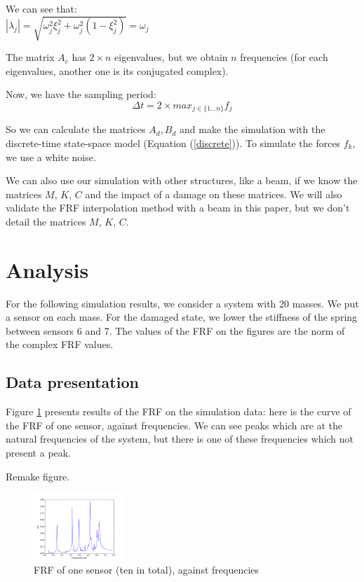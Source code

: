 \documentclass[journal]{IEEEtran}
\begin{document}
\begin{remark}
We can see that:\\
$|\lambda_j| = \sqrt{\omega_j^2 \xi_j^2 + \omega_j^2 (1 - \xi_j^2)} = \omega_j$
\end{remark}

\begin{remark}
The matrix $A_c$ has $2 \times n$ eigenvalues, but we obtain $n$ frequencies (for each eigenvalues, another one is its conjugated complex).
\end{remark}

Now, we have the sampling period:
\begin{equation}
\Delta t = 2 \times max_{j \in \{1 ... n\} } f_j
\end{equation}

So we can calculate the matrices $A_d, B_d$ and make the simulation with the discrete-time state-space model (Equation (\ref{discrete})). To simulate the forces $f_k$, we use a white noise.


We can also use our simulation with other structures, like a beam, if we know the matrices $M$, $K$, $C$ and the impact of a damage on these matrices.
We will also validate the FRF interpolation method with a beam in this paper, but we don't detail the matrices $M$, $K$, $C$.


\section{Analysis}

For the following simulation results, we consider a system with 20 masses. We put a sensor on each mass. For the damaged state, we lower the stiffness of the spring between sensors 6 and 7. The values of the FRF on the figures are the norm of the complex FRF values.


\subsection{Data presentation}

Figure \ref{frf_freq} presents results of the FRF on the simulation data: here is the curve of the FRF of one sensor, against frequencies. We can see peaks which are at the natural frequencies of the system, but there is one of these frequencies which not present a peak.

Remake figure.

\begin{figure}[h!]
  \centering
  \includegraphics[width=0.3\textwidth]{images/persensor1.png}
  \caption{FRF of one sensor (ten in total), against frequencies}
  \label{frf_freq}
\end{figure}
\end{document}
